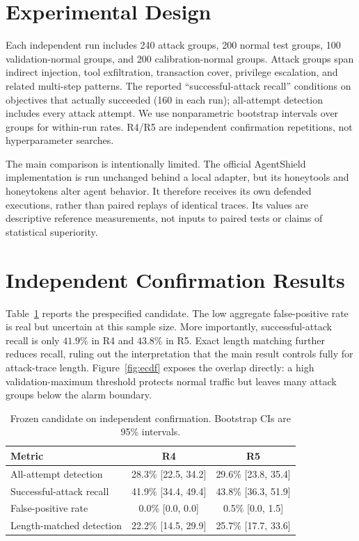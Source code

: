 \documentclass[10pt,conference]{IEEEtran}
\begin{document}
\section{Experimental Design}
Each independent run includes 240 attack groups, 200 normal test groups, 100 validation-normal groups, and 200 calibration-normal groups. Attack groups span indirect injection, tool exfiltration, transaction cover, privilege escalation, and related multi-step patterns. The reported ``successful-attack recall'' conditions on objectives that actually succeeded (160 in each run); all-attempt detection includes every attack attempt. We use nonparametric bootstrap intervals over groups for within-run rates. R4/R5 are independent confirmation repetitions, not hyperparameter searches.

The main comparison is intentionally limited. The official AgentShield implementation is run unchanged behind a local adapter, but its honeytools and honeytokens alter agent behavior. It therefore receives its own defended executions, rather than paired replays of identical traces. Its values are descriptive reference measurements, not inputs to paired tests or claims of statistical superiority.

\section{Independent Confirmation Results}
Table~\ref{tab:main} reports the prespecified candidate. The low aggregate false-positive rate is real but uncertain at this sample size. More importantly, successful-attack recall is only $41.9\%$ in R4 and $43.8\%$ in R5. Exact length matching further reduces recall, ruling out the interpretation that the main result controls fully for attack-trace length. Figure~\ref{fig:ecdf} exposes the overlap directly: a high validation-maximum threshold protects normal traffic but leaves many attack groups below the alarm boundary.

\begin{table}[t]
\caption{Frozen candidate on independent confirmation. Bootstrap CIs are 95\% intervals.}
\label{tab:main}
\centering\footnotesize
\begin{tabular}{@{}lcc@{}}
\toprule
Metric & R4 & R5\\
\midrule
All-attempt detection & 28.3\% [22.5, 34.2] & 29.6\% [23.8, 35.4]\\
Successful-attack recall & 41.9\% [34.4, 49.4] & 43.8\% [36.3, 51.9]\\
False-positive rate & 0.0\% [0.0, 0.0] & 0.5\% [0.0, 1.5]\\
Length-matched detection & 22.2\% [14.5, 29.9] & 25.7\% [17.7, 33.6]\\
\bottomrule
\end{tabular}
\end{table}
\end{document}
